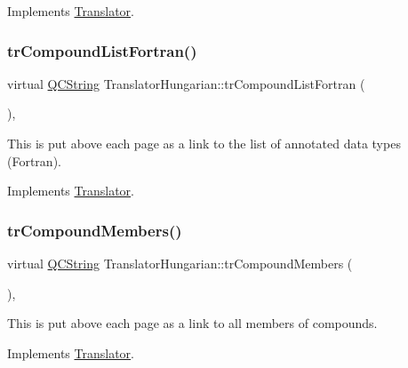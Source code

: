 Implements \mbox{\hyperlink{class_translator}{Translator}}.

\mbox{\label{class_translator_hungarian_a46b8817bb2ed7381fbb18a4ef8531181}} 
\subsubsection{\texorpdfstring{trCompoundListFortran()}{trCompoundListFortran()}}
{\footnotesize\ttfamily virtual \mbox{\hyperlink{class_q_c_string}{Q\+C\+String}} Translator\+Hungarian\+::tr\+Compound\+List\+Fortran (\begin{DoxyParamCaption}{ }\end{DoxyParamCaption})\hspace{0.3cm}{\ttfamily [inline]}, {\ttfamily [virtual]}}

This is put above each page as a link to the list of annotated data types (Fortran). 

Implements \mbox{\hyperlink{class_translator}{Translator}}.

\mbox{\label{class_translator_hungarian_a36dab70f70a4cf812981fcc7cbc4cca8}} 
\subsubsection{\texorpdfstring{trCompoundMembers()}{trCompoundMembers()}}
{\footnotesize\ttfamily virtual \mbox{\hyperlink{class_q_c_string}{Q\+C\+String}} Translator\+Hungarian\+::tr\+Compound\+Members (\begin{DoxyParamCaption}{ }\end{DoxyParamCaption})\hspace{0.3cm}{\ttfamily [inline]}, {\ttfamily [virtual]}}

This is put above each page as a link to all members of compounds. 

Implements \mbox{\hyperlink{class_translator}{Translator}}.

\mbox{\label{class_translator_hungarian_ae55a500b580399d6ad2676eba47173b8}} 
